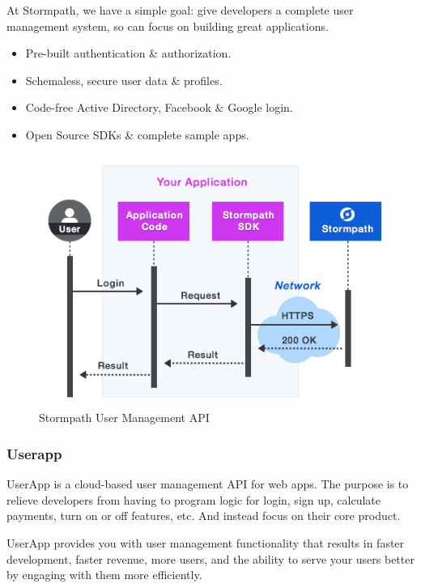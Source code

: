 At Stormpath, we have a simple goal: give developers a complete user management system, so can focus on building great applications.\cite{usr_stormpath}

\begin{itemize}
\item Pre-built authentication \& authorization.
\item Schemaless, secure user data \& profiles.
\item Code-free Active Directory, Facebook \& Google login.
\item Open Source SDKs \& complete sample apps.
\end{itemize}

\begin {figure}[h]
\graphicspath{{images/chapter_USR/}}
\includegraphics[width=\textwidth]{stormpath}
\caption{Stormpath User Management API}
\end {figure}

\subsubsection{Userapp}

UserApp is a cloud-based user management API for web apps. The purpose is to relieve developers from having to program logic for login, sign up, calculate payments, turn on or off features, etc. And instead focus on their core product.

UserApp provides you with user management functionality that results in faster development, faster revenue, more users, and the ability to serve your users better by engaging with them more efficiently.\cite{usr_userapp}

